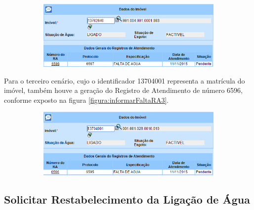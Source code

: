\begin{figure}[H]
	\centering
	\caption{\textbf{Informar Falta de Água - RA gerado para o Cenário 2}}
	\label{figura:informarFaltaRA2}
	\begin{subfigure}[H]{\textwidth}
		\centering
		\includegraphics{figuras/cenarios/informar_falta_agua/resultado_2.PNG}
	\end{subfigure}
\end{figure}

Para o terceiro cenário, cujo o identificador 13704001 representa a matrícula do imóvel, também houve a geração do Registro de Atendimento de número 6596, conforme exposto na figura \ref{figura:informarFaltaRA3}.	

\begin{figure}[H]
	\centering
	\caption{\textbf{Informar Falta de Água - RA gerado para o Cenário 3}}
	\label{figura:informarFaltaRA3}
	\begin{subfigure}[H]{\textwidth}
		\centering
		\includegraphics{figuras/cenarios/informar_falta_agua/resultado_3.PNG}
	\end{subfigure}
\end{figure}

		
\subsection{\textbf{Solicitar Restabelecimento da Ligação de Água}}

